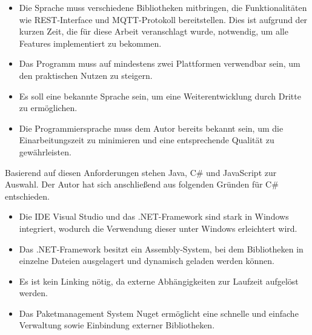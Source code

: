     \begin{itemize}
        \item Die Sprache muss verschiedene Bibliotheken mitbringen, die Funktionalitäten wie REST-Interface und \ac{MQTT}-Protokoll bereitstellen. Dies ist aufgrund der kurzen Zeit, die für diese Arbeit veranschlagt wurde, notwendig, um alle Features implementiert zu bekommen.
        \item Das Programm muss auf mindestens zwei Plattformen verwendbar sein, um den praktischen Nutzen zu steigern.
        \item Es soll eine bekannte Sprache sein, um eine Weiterentwicklung durch Dritte zu ermöglichen.
        \item Die Programmiersprache muss dem Autor bereits bekannt sein, um die Einarbeitungszeit zu minimieren und eine entsprechende Qualität zu gewährleisten.
    \end{itemize}
    Basierend auf diesen Anforderungen stehen Java, C\# und JavaScript zur Auswahl.
    Der Autor hat sich anschließend aus folgenden Gründen für C\# entschieden.
    \begin{itemize}
        \item Die \ac{IDE} Visual Studio und das .NET-Framework sind stark in Windows integriert, wodurch die Verwendung dieser unter Windows erleichtert wird.
        \item Das .NET-Framework besitzt ein Assembly-System, bei dem Bibliotheken in einzelne Dateien ausgelagert und dynamisch geladen werden können.
        \item Es ist kein Linking nötig, da externe Abhängigkeiten zur Laufzeit aufgelöst werden.
        \item Das Paketmanagement System Nuget ermöglicht eine schnelle und einfache Verwaltung sowie Einbindung externer Bibliotheken.
    \end{itemize}
    

